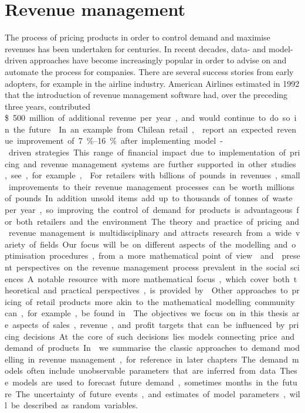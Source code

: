 \documentclass[main.tex]{subfiles}
\begin{document}
\section{Revenue management}

The process of pricing products in order to control demand and
maximise revenues has been undertaken for centuries. In recent
decades, data- and model-driven approaches have become increasingly
popular in order to advise on and automate the process for companies.
There are several success stories from early adopters, for example in
the airline industry.
American Airlines estimated in 1992 that the introduction of revenue
management software had, over the preceding three
years, contributed \SI{500}[\$] million of additional revenue per year,
and would continue to do so in the future \citep{smith1992yield}.
In an example from Chilean retail, \citet{bitran1998coordinating}
report an expected revenue improvement of \SIrange{7}{16}{\percent} after implementing
model-driven strategies.
This range of financial impact due to implementation of pricing and revenue
management systems are further supported in other studies, see, for example, \citet[Ch.~1.2]{phillips2005pricing}.
For retailers with billions of pounds in revenues, small
improvements to their revenue management processes can be worth millions
of pounds.
In addition unsold items add up to thousands of tonnes of waste per year, so
improving the control of demand for products is advantageous
for both retailers and the environment.

The theory and practice of pricing and revenue management is
multidisciplinary and attracts research from a wide variety of
fields. Our focus will be on different aspects of the modelling and
optimisation procedures, from a more mathematical point of view.
\citet{phillips2005pricing} and \citet{ozer2012oxford} present perspectives on the
revenue management process prevalent in the social sciences.
A notable resource with more mathematical focus, which
cover both theoretical and practical
perspectives, is provided by \citet{talluri2006theory}.
Other approaches to pricing of retail products more akin to the
mathematical modelling community can, for example, be found
in \citet{butler2014customer}.

The objectives we focus on in this thesis are aspects of sales,
revenue, and profit targets that can be influenced by pricing
decisions.  At the core of such decisions lies models connecting price
and demand of products.  In  we summarise
the classic approaches to demand modelling in revenue management, for
reference in later chapters.  The demand models often include
unobservable parameters that are inferred from data.  These models are
used to forecast future demand, sometimes months in the future.  The
uncertainty of future events, and estimates of model parameters, will
be described as random variables.
\end{document}
